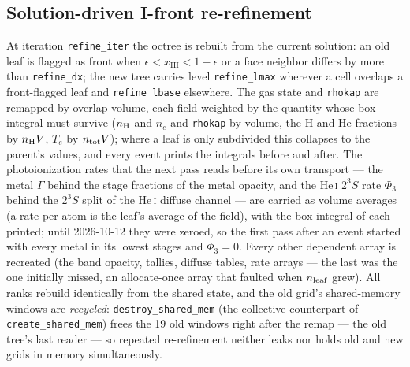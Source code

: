 \documentclass[english,a4paper]{my_memo}
\newcommand{\code}[1]{\texttt{#1}}
\newcommand{\xHI}{x_{\mathrm{HI}}}
\begin{document}
\subsection{Solution-driven I-front re-refinement}
\label{sec:refine}
At iteration \code{refine\_iter} the octree is rebuilt from the current
solution: an old leaf is flagged as front when
$\epsilon < \xHI < 1{-}\epsilon$ or a face neighbor differs by more than
\code{refine\_dx}; the new tree carries level \code{refine\_lmax}
wherever a cell overlaps a front-flagged leaf and \code{refine\_lbase}
elsewhere.  The gas state and \code{rhokap} are remapped by overlap
volume, each field weighted by the quantity whose box integral must
survive ($n_{\rm H}$ and $n_e$ and \code{rhokap} by volume, the H and He
fractions by $n_{\rm H}V$, $T_e$ by $n_{\rm tot}V$); where a leaf is
only subdivided this collapses to the parent's values, and every event
prints the integrals before and after.  The photoionization rates that
the next pass reads before its own transport --- the metal $\Gamma$
behind the stage fractions of the metal opacity, and the He\,\textsc{i}
$2^3S$ rate $\Phi_3$ behind the $2^3S$ split of the He\,\textsc{i}
diffuse channel --- are carried as volume averages (a rate per atom is
the leaf's average of the field), with the box integral of each printed;
until 2026-10-12 they were zeroed, so the first pass after an event
started with every metal in its lowest stages and $\Phi_3 = 0$.  Every
other dependent array is recreated (the band opacity, tallies, diffuse
tables, rate arrays --- the last was the one initially missed, an
allocate-once array that faulted when $n_{\rm leaf}$ grew).  All ranks
rebuild identically from the shared state, and the old grid's
shared-memory windows are \emph{recycled}: \code{destroy\_shared\_mem}
(the collective counterpart of \code{create\_shared\_mem}) frees the 19
old windows right after the remap --- the old tree's last reader --- so
repeated
re-refinement neither leaks nor holds old and new grids in memory
simultaneously.
\end{document}
